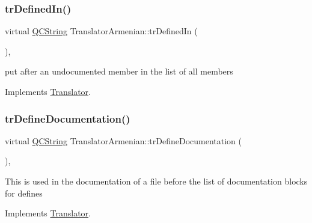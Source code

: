 \mbox{\label{class_translator_armenian_a063662d0b2ac4917ef1cbbd582c67a31}} 
\subsubsection{\texorpdfstring{trDefinedIn()}{trDefinedIn()}}
{\footnotesize\ttfamily virtual \mbox{\hyperlink{class_q_c_string}{Q\+C\+String}} Translator\+Armenian\+::tr\+Defined\+In (\begin{DoxyParamCaption}{ }\end{DoxyParamCaption})\hspace{0.3cm}{\ttfamily [inline]}, {\ttfamily [virtual]}}

put after an undocumented member in the list of all members 

Implements \mbox{\hyperlink{class_translator}{Translator}}.

\mbox{\label{class_translator_armenian_ad092a939e227d6dead843e691dba3d71}} 
\subsubsection{\texorpdfstring{trDefineDocumentation()}{trDefineDocumentation()}}
{\footnotesize\ttfamily virtual \mbox{\hyperlink{class_q_c_string}{Q\+C\+String}} Translator\+Armenian\+::tr\+Define\+Documentation (\begin{DoxyParamCaption}{ }\end{DoxyParamCaption})\hspace{0.3cm}{\ttfamily [inline]}, {\ttfamily [virtual]}}

This is used in the documentation of a file before the list of documentation blocks for defines 

Implements \mbox{\hyperlink{class_translator}{Translator}}.

\mbox{\label{class_translator_armenian_a0fd0f59d54ae545968788018e28e2c77}} 
